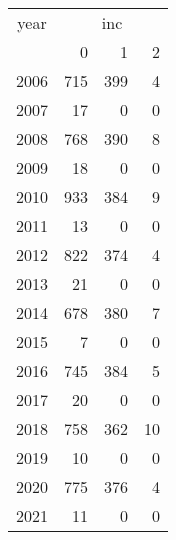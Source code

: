 \footnotesize\begin{tabular}[t]{lrrr}
\toprule
\multicolumn{1}{c}{year} & \multicolumn{3}{c}{inc} \\
\cmidrule(l{3pt}r{3pt}){1-1} \cmidrule(l{3pt}r{3pt}){2-4}
  & 0 & 1 & 2\\
\midrule
2006 & 715 & 399 & 4\\
2007 & 17 & 0 & 0\\
2008 & 768 & 390 & 8\\
2009 & 18 & 0 & 0\\
2010 & 933 & 384 & 9\\
2011 & 13 & 0 & 0\\
2012 & 822 & 374 & 4\\
2013 & 21 & 0 & 0\\
2014 & 678 & 380 & 7\\
2015 & 7 & 0 & 0\\
2016 & 745 & 384 & 5\\
2017 & 20 & 0 & 0\\
2018 & 758 & 362 & 10\\
2019 & 10 & 0 & 0\\
2020 & 775 & 376 & 4\\
2021 & 11 & 0 & 0\\
\bottomrule
\end{tabular}
